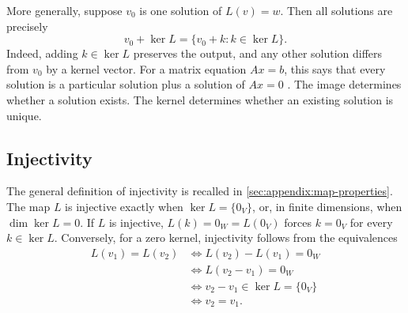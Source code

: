 More generally, suppose \(v_0\) is one solution of \(L(v)=w\). Then all
solutions are precisely
\[
  v_0+\ker L=\{v_0+k:k\in\ker L\}.
\]
Indeed, adding \(k\in\ker L\) preserves the output, and any other solution
differs from \(v_0\) by a kernel vector. For a matrix equation \(Ax=b\),
this says that every solution is a particular solution plus a solution
of \(Ax=0\) \cite{MargalitRabinoffSolutionSets}. The image determines
whether a solution exists. The kernel determines whether an existing
solution is unique.

\subsection{Injectivity}

The general definition of injectivity is recalled in
\autoref{sec:appendix:map-properties}.
The map \(L\) is injective exactly when \(\ker L=\{0_V\}\), or,
in finite dimensions, when \(\dim\ker L=0\). If \(L\) is injective,
\(L(k)=0_W=L(0_V)\) forces \(k=0_V\) for every \(k\in\ker L\).
Conversely, for a zero kernel, injectivity follows from the equivalences
\[
  \begin{aligned}
    L(v_1)=L(v_2)
      &\iff L(v_2)-L(v_1)=0_W\\
      &\iff L(v_2-v_1)=0_W\\
      &\iff v_2-v_1\in\ker L=\{0_V\}\\
      &\iff v_2=v_1.
  \end{aligned}
\]
